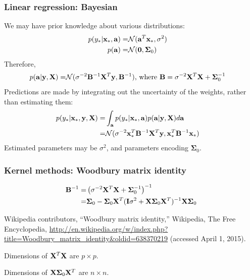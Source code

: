 \begin{frame}
\frametitle{Linear regression: Bayesian}
We may have prior knowledge about various distributions:
\begin{align*}
p(y_* | {\bf x}_*, {\bf a}) = & \mathcal{N}({\bf a}^T{\bf x}_*, \sigma^2)\cr
p({\bf a}) = & \mathcal{N}({\bf 0},\boldsymbol\Sigma_0)\cr
\end{align*}
Therefore,
\begin{align*}
p({\bf a}|{\bf y},{\bf X})  = & \mathcal{N}(\sigma^{-2}{\bf B}^{-1}{\bf X}^T{\bf y},{\bf B}^{-1}) \text{, where } {\bf B} = \sigma^{-2}{\bf X}^T{\bf X} + \boldsymbol\Sigma_0^{-1}
\end{align*}
Predictions are made by integrating out the uncertainty of the weights, rather than estimating them:
\begin{align*}
p(y_* | {\bf x}_*, {\bf y}, {\bf X}) = & \int_{\bf a} p(y_* | {\bf x}_*, {\bf a}) p({\bf a}|{\bf y},{\bf X}) d{\bf a}\cr
                                     = & \mathcal{N}(\sigma^{-2} {\bf x}_*^T {\bf B}^{-1} {\bf X}^T {\bf y}, {\bf x}_*^T{\bf B}^{-1}{\bf x}_*)
\end{align*}
Estimated parameters may be $\sigma^2$, and parameters encoding $\boldsymbol\Sigma_0$.
\end{frame}

\begin{frame}
\frametitle{Kernel methods: Woodbury matrix identity}
\begin{align*}
{\bf B}^{-1} = & \left(\sigma^{-2}{\bf X}^T{\bf X} + \boldsymbol\Sigma_0^{-1}\right)^{-1}\\
             = & \boldsymbol\Sigma_0 - \boldsymbol\Sigma_0 {\bf X}^T({\bf I}\sigma^2 + {\bf X} \boldsymbol\Sigma_0 {\bf X}^T)^{-1} {\bf X} \boldsymbol\Sigma_0
\end{align*}

\vspace{0.25cm}
\begin{tiny}
Wikipedia contributors, ``Woodbury matrix identity,'' Wikipedia, The Free Encyclopedia, \url{http://en.wikipedia.org/w/index.php?title=Woodbury\_matrix\_identity\&oldid=638370219} (accessed April 1, 2015).\par
\end{tiny}
Dimensions of ${\bf X}^T{\bf X}$ are $p \times p$.\par
Dimensions of ${\bf X} \boldsymbol\Sigma_0 {\bf X}^T$ are $n \times n$.\par
\end{frame}

